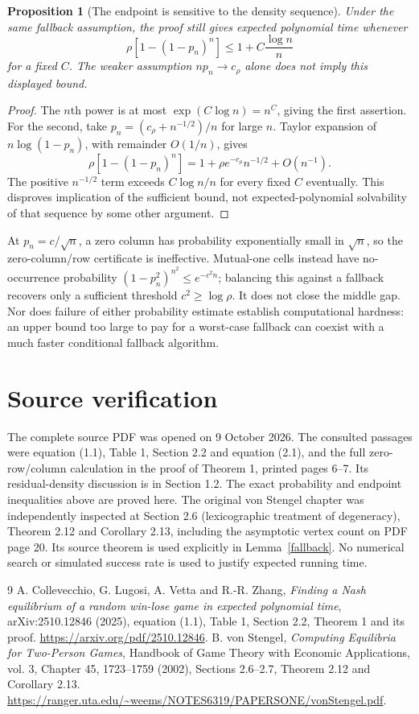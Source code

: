 \documentclass[11pt]{article}
\newtheorem{proposition}[theorem]{Proposition}
\theoremstyle{remark}
\begin{document}
\begin{proposition}[The endpoint is sensitive to the density sequence]
Under the same fallback assumption, the proof still gives expected polynomial time whenever
\[
 \rho[1-(1-p_n)^n]\leq1+C\frac{\log n}{n}
\]
for a fixed $C$. The weaker assumption $np_n\to c_\rho$ alone does not imply this displayed bound.
\end{proposition}
\begin{proof}
The $n$th power is at most $\exp(C\log n)=n^C$, giving the first assertion. For the second, take $p_n=(c_\rho+n^{-1/2})/n$ for large $n$. Taylor expansion of $n\log(1-p_n)$, with remainder $O(1/n)$, gives
\[
 \rho[1-(1-p_n)^n]=1+\rho e^{-c_\rho}n^{-1/2}+O(n^{-1}).
\]
The positive $n^{-1/2}$ term exceeds $C\log n/n$ for every fixed $C$ eventually. This disproves implication of the sufficient bound, not expected-polynomial solvability of that sequence by some other argument.
\end{proof}

At $p_n=c/\sqrt n$, a zero column has probability exponentially small in $\sqrt n$, so the zero-column/row certificate is ineffective. Mutual-one cells instead have no-occurrence probability $(1-p_n^2)^{n^2}\leq e^{-c^2n}$; balancing this against a fallback recovers only a sufficient threshold $c^2\geq\log\rho$. It does not close the middle gap. Nor does failure of either probability estimate establish computational hardness: an upper bound too large to pay for a worst-case fallback can coexist with a much faster conditional fallback algorithm.

\section{Source verification}
The complete source PDF was opened on 9 October 2026. The consulted passages were equation (1.1), Table 1, Section 2.2 and equation (2.1), and the full zero-row/column calculation in the proof of Theorem 1, printed pages 6--7. Its residual-density discussion is in Section 1.2. The exact probability and endpoint inequalities above are proved here. The original von Stengel chapter was independently inspected at Section 2.6 (lexicographic treatment of degeneracy), Theorem 2.12 and Corollary 2.13, including the asymptotic vertex count on PDF page 20. Its source theorem is used explicitly in Lemma~\ref{fallback}. No numerical search or simulated success rate is used to justify expected running time.

\begin{thebibliography}{9}
 A. Collevecchio, G. Lugosi, A. Vetta and R.-R. Zhang, \emph{Finding a Nash equilibrium of a random win-lose game in expected polynomial time}, arXiv:2510.12846 (2025), equation (1.1), Table 1, Section 2.2, Theorem 1 and its proof. \url{https://arxiv.org/pdf/2510.12846}.
 B. von Stengel, \emph{Computing Equilibria for Two-Person Games}, Handbook of Game Theory with Economic Applications, vol. 3, Chapter 45, 1723--1759 (2002), Sections 2.6--2.7, Theorem 2.12 and Corollary 2.13. \url{https://ranger.uta.edu/~weems/NOTES6319/PAPERSONE/vonStengel.pdf}.
\end{thebibliography}
\end{document}
